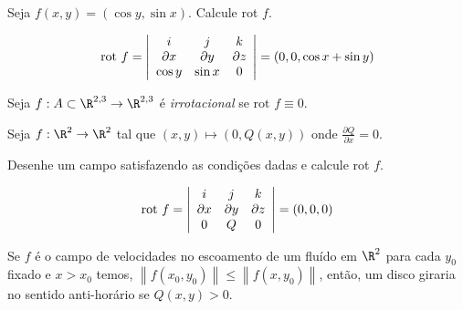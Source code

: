 \documentclass{book}
\begin{document}
\begin{ex}
Seja $f\left( {x,y} \right) = \left( {\cos y,\sin x} \right)$. Calcule rot $f$.
\end{ex}

\begin{sol}
\[
{\text{rot }}f = \left| {\begin{array}{*{20}c}
   i & j & k  \\
   {\partial x} & {\partial y} & {\partial z}  \\
   {\cos y} & {\sin x} & 0  \\

 \end{array} } \right| = \left( {0,0,\cos x + \sin y} \right)
\]

\end{sol}

\begin{defn}
Seja $f:A \subset \R^{2,3}  \to \R^{2,3}$ \'e \textit{irrotacional} se ${\text{rot }}f \equiv 0$.
\end{defn}

\begin{ex}
Seja $f:\R^2  \to \R^2$ tal que $\left( {x,y} \right) \mapsto \left( {0,Q\left( {x,y} \right)} \right)$ onde $\frac{{\partial Q}}{{\partial x}} = 0$.

Desenhe um campo satisfazendo as condi\c c\~oes dadas e calcule rot $f$.
\end{ex}

\begin{sol}

\[
{\text{rot }}f = \left| {\begin{array}{*{20}c}
   i & j & k  \\
   {\partial x} & {\partial y} & {\partial z}  \\
   0 & Q & 0  \\

 \end{array} } \right| = \left( {0,0,0} \right)
\]

\end{sol}

\begin{ex}
Se $f$ \'e o campo de velocidades no escoamento de um flu\'ido em $\R^2$ para cada $y_0$ fixado e $x > x_0$ temos, $\left\| {f\left( {x_0 ,y_0 } \right)} \right\| \leqslant \left\| {f\left( {x,y_0 } \right)} \right\|$, ent\~ao, um disco giraria no sentido anti-hor\'ario se $Q\left( {x,y} \right) > 0$.
\end{ex}
\end{document}

